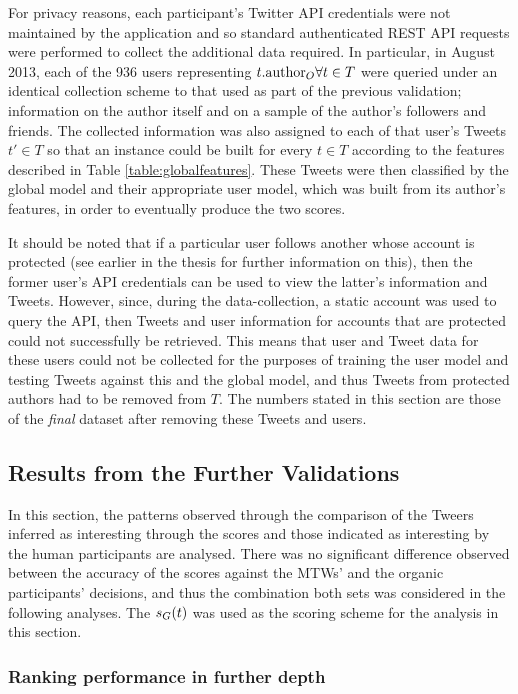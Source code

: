 For privacy reasons, each participant's Twitter API credentials were not maintained by the application and so standard authenticated REST API requests were performed to collect the additional data required. In particular, in August 2013, each of the 936 users representing $t.\textrm{author}_O \forall t \in T$ were queried under an identical collection scheme to that used as part of the previous validation; information on the author itself and on a sample of the author's followers and friends. The collected information was also assigned to each of that user's Tweets $t' \in T$ so that an instance could be built for every $t \in T$ according to the features described in Table \ref{table:globalfeatures}. These Tweets were then classified by the global model and their appropriate user model, which was built from its author's features, in order to eventually produce the two scores. 

It should be noted that if a particular user follows another whose account is protected (see earlier in the thesis for further information on this), then the former user's API credentials can be used to view the latter's information and Tweets. However, since, during the data-collection, a static account was used to query the API, then Tweets and user information for accounts that are protected could not successfully be retrieved. This means that user and Tweet data for these users could not be collected for the purposes of training the user model and testing Tweets against this and the global model, and thus Tweets from protected authors had to be removed from $T$. The numbers stated in this section are those of the \textit{final} dataset after removing these Tweets and users.


\subsection{Results from the Further Validations}
In this section, the patterns observed through the comparison of the Tweers inferred as interesting through the scores and those indicated as interesting by the human participants are analysed. There was no significant difference observed between the accuracy of the scores against the MTWs' and the organic participants' decisions, and thus the combination both sets was considered in the following analyses.
The $s_G(t)$ was used as the scoring scheme for the analysis in this section.

\subsubsection{Ranking performance in further depth}

